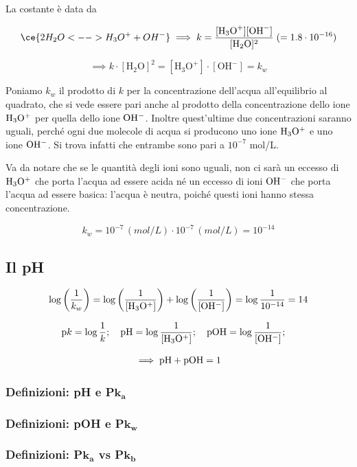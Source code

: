 La costante è data da

$$\ce{2 H_2O <--> H_3O^+ + OH^-}
\implies
k= \frac{[\text{H}_3\text{O}^+] [\text{OH}^-]}{[\text{H}_2\text{O}]^2} \; (=1.8 \cdot 10^{-16})$$

$$\implies k \cdot [\text{H}_2\text{O}]^2 = [\text{H}_3\text{O}^+] \cdot [\text{OH}^-] = k_w$$

Poniamo $k_w$ il prodotto di $k$ per la concentrazione dell'acqua all'equilibrio al quadrato, che si vede essere pari anche al prodotto della concentrazione dello ione $\rm H_3O^+$ per quella dello ione $\rm OH^-$. Inoltre quest'ultime due concentrazioni saranno uguali, perché ogni due molecole di acqua si producono uno ione $\rm H_3O^+$ e uno ione $\rm OH^-$. Si trova infatti che entrambe sono pari a $10^{-7}$ mol/L.

Va da notare che se le quantità degli ioni sono uguali, non ci sarà un eccesso di $\rm H_3O^+$ che porta l'acqua ad essere acida né un eccesso di ioni $\rm OH^-$ che porta l'acqua ad essere basica: l'acqua è neutra, poiché questi ioni hanno stessa concentrazione.

$$k_w = 10^{-7} \, (mol/L) \cdot 10^{-7} \, (mol/L) = 10^{-14}$$
\subsection{Il pH}
$$\log \left( \frac{1}{k_w} \right) = \log \left( \frac{1}{\rm{[H_3O^+]}} \right) + \log \left( \frac{1}{\rm{[OH^-]}} \right) = \log \frac{1}{10^{-14}}=14$$

$$\text{p}k = \log \frac{1}{k}; \quad \rm pH = \log \frac{1}{[H_3O^+]}; \quad pOH = \log \frac{1}{[OH^-]}; \quad$$

$$\implies \rm pH + pOH = 1$$

\subsubsection{Definizioni: pH e P$\boldsymbol{k_a}$}

\subsubsection{Definizioni: pOH e P$\boldsymbol{k_w}$}

\subsubsection{Definizioni: P$\boldsymbol{k_a}$ vs P$\boldsymbol{k_b}$}

